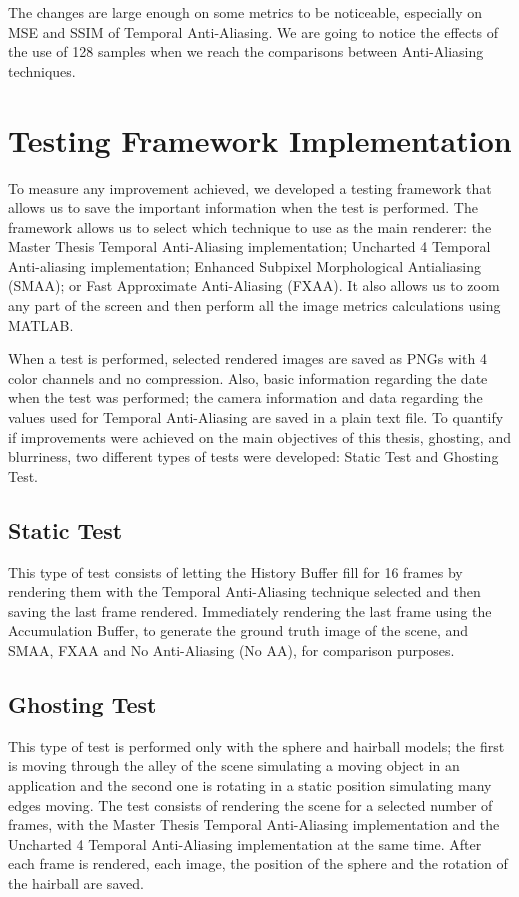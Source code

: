 \documentclass{cslthse-msc}
\begin{document}
The changes are large enough on some metrics to be noticeable, especially on MSE and SSIM of Temporal Anti-Aliasing. We are going to notice the effects of the use of 128 samples when we reach the comparisons between Anti-Aliasing techniques.

\section{Testing Framework Implementation}
To measure any improvement achieved, we developed a testing framework that allows us to save the important information when the test is performed. The framework allows us to select which technique to use as the main renderer: the Master Thesis Temporal Anti-Aliasing implementation; Uncharted 4 Temporal Anti-aliasing implementation; Enhanced Subpixel Morphological Antialiasing (SMAA); or Fast Approximate Anti-Aliasing (FXAA). It also allows us to zoom any part of the screen and then perform all the image metrics calculations using MATLAB.

When a test is performed, selected rendered images are saved as PNGs with 4 color channels and no compression. Also, basic information regarding the date when the test was performed; the camera information and data regarding the values used for Temporal Anti-Aliasing are saved in a plain text file.
To quantify if improvements were achieved on the main objectives of this thesis, ghosting, and blurriness, two different types of tests were developed: Static Test and Ghosting Test.

\subsection{Static Test}
This type of test consists of letting the History Buffer fill for 16 frames by rendering them with the Temporal Anti-Aliasing technique selected and then saving the last frame rendered. Immediately rendering the last frame using the Accumulation Buffer, to generate the ground truth image of the scene, and SMAA, FXAA and No Anti-Aliasing (No AA), for comparison purposes. 

\subsection{Ghosting Test}
This type of test is performed only with the sphere and hairball models; the first is moving through the alley of the scene simulating a moving object in an application and the second one is rotating in a static position simulating many edges moving. The test consists of rendering the scene for a selected number of frames, with the Master Thesis Temporal Anti-Aliasing implementation and the Uncharted 4 Temporal Anti-Aliasing implementation at the same time. After each frame is rendered, each image, the position of the sphere and the rotation of the hairball are saved.
\end{document}
